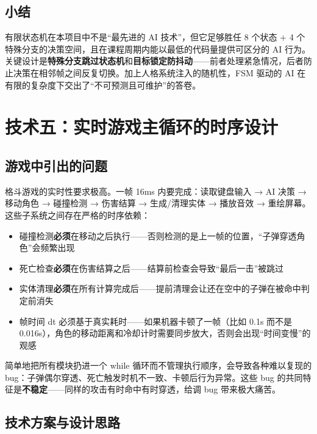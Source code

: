 \documentclass[utf8]{ctexart}
\begin{document}
\subsection{小结}

有限状态机在本项目中不是“最先进的 AI 技术”，但它足够胜任 8 个状态 + 4 个特殊分支的决策空间，且在课程周期内能以最低的代码量提供可区分的 AI 行为。关键设计是\textbf{特殊分支跳过状态机}和\textbf{目标锁定防抖动}——前者处理紧急情况，后者防止决策在相邻帧之间反复切换。加上人格系统注入的随机性，FSM 驱动的 AI 在有限的复杂度下交出了“不可预测且可维护”的答卷。

\newpage

\section{技术五：实时游戏主循环的时序设计}

\subsection{游戏中引出的问题}

格斗游戏的实时性要求极高。一帧 16ms 内要完成：读取键盘输入 → AI 决策 → 移动角色 → 碰撞检测 → 伤害结算 → 生成/清理实体 → 播放音效 → 重绘屏幕。这些子系统之间存在严格的时序依赖：

\begin{itemize}
  \item 碰撞检测\textbf{必须}在移动之后执行——否则检测的是上一帧的位置，“子弹穿透角色”会频繁出现
  \item 死亡检查\textbf{必须}在伤害结算之后——结算前检查会导致“最后一击”被跳过
  \item 实体清理\textbf{必须}在所有计算完成后——提前清理会让还在空中的子弹在被命中判定前消失
  \item 帧时间 dt 必须基于真实耗时——如果机器卡顿了一帧（比如 0.1s 而不是 0.016s），角色的移动距离和冷却计时需要同步放大，否则会出现“时间变慢”的观感
\end{itemize}

简单地把所有模块扔进一个 while 循环而不管理执行顺序，会导致各种难以复现的 bug：子弹偶尔穿透、死亡触发时机不一致、卡顿后行为异常。这些 bug 的共同特征是\textbf{不稳定}——同样的攻击有时命中有时穿透，给调 bug 带来极大痛苦。

\subsection{技术方案与设计思路}
\end{document}
